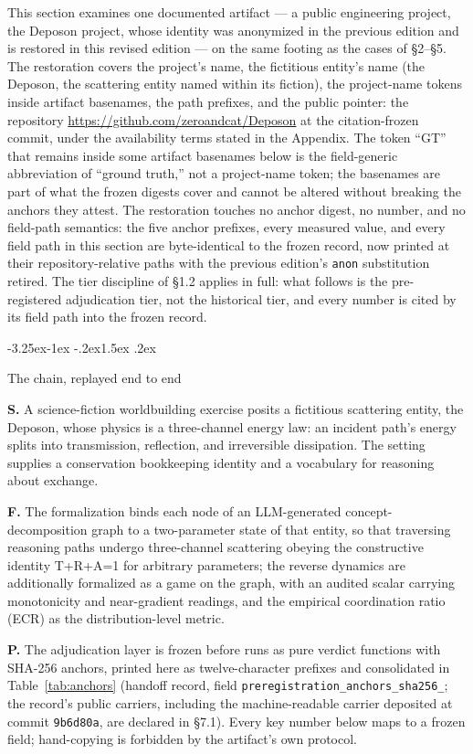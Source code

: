 \documentclass[11pt,a4paper]{article}
\makeatletter
\renewcommand\subsection{\@startsection{subsection}{2}{\z@}%
  {-3.25ex\@plus -1ex \@minus -.2ex}{1.5ex \@plus .2ex}%
  {\normalfont\large\bfseries\raggedright}}
\makeatother
\begin{document}
This section examines one documented artifact — a public engineering project, the Deposon project, whose identity was anonymized in the previous edition and is restored in this revised edition — on the same footing as the cases of §2–§5. The restoration covers the project's name, the fictitious entity's name (the Deposon, the scattering entity named within its fiction), the project-name tokens inside artifact basenames, the path prefixes, and the public pointer: the repository \url{https://github.com/zeroandcat/Deposon} at the citation-frozen commit, under the availability terms stated in the Appendix. The token ``GT'' that remains inside some artifact basenames below is the field-generic abbreviation of ``ground truth,'' not a project-name token; the basenames are part of what the frozen digests cover and cannot be altered without breaking the anchors they attest. The restoration touches no anchor digest, no number, and no field-path semantics: the five anchor prefixes, every measured value, and every field path in this section are byte-identical to the frozen record, now printed at their repository-relative paths with the previous edition's \texttt{anon} substitution retired. The tier discipline of §1.2 applies in full: what follows is the pre-registered adjudication tier, not the historical tier, and every number is cited by its field path into the frozen record.

\subsection{The chain, replayed end to end}

\textbf{S.} A science-fiction worldbuilding exercise posits a fictitious scattering entity, the Deposon, whose physics is a three-channel energy law: an incident path's energy splits into transmission, reflection, and irreversible dissipation. The setting supplies a conservation bookkeeping identity and a vocabulary for reasoning about exchange.

\textbf{F.} The formalization binds each node of an LLM-generated concept-decomposition graph to a two-parameter state of that entity, so that traversing reasoning paths undergo three-channel scattering obeying the constructive identity T+R+A=1 for arbitrary parameters; the reverse dynamics are additionally formalized as a game on the graph, with an audited scalar carrying monotonicity and near-gradient readings, and the empirical coordination ratio (ECR) as the distribution-level metric.

\textbf{P.} The adjudication layer is frozen before runs as pure verdict functions with SHA-256 anchors, printed here as twelve-character prefixes and consolidated in Table~\ref{tab:anchors} (handoff record, field \texttt{preregistration\_\allowbreak anchors\_\allowbreak sha256\_}; the record's public carriers, including the machine-readable carrier deposited at commit \texttt{9b6d80a}, are declared in §7.1). Every key number below maps to a frozen field; hand-copying is forbidden by the artifact's own protocol.
\end{document}
